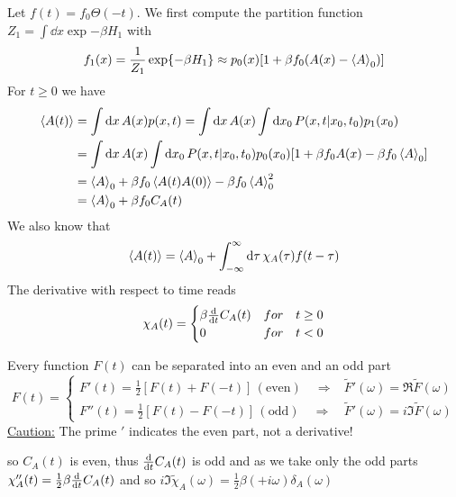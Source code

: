 \documentclass{/home/ben/Templates/notebook}
\begin{document}
	Let $f(t) = f_0 \Theta(-t)$. We first compute the partition function $Z_1 = \int \dd{x} \exp{- \beta H_1}$ with 
	\begin{equation}
	f_1(x) = \frac{1}{Z_1} \exp{- \beta H_1} \approx p_0(x) [1 + \beta f_0(A(x) - \expval{A}_0)]
	\end{equation}
	For $t \geq 0$ we have 
	\begin{align*}
		\expval{A(t)} &= \int \dd{x} A(x) p(x,t) = \int \dd{x} A(x) \int \dd{x_0} P(x, t | x_0, t_0) p_1(x_0) \\
		&= \int \dd{x} A(x) \int \dd{x_0} P(x, t | x_0, t_0) p_0(x_0) [1 + \beta f_0 A(x) - \beta f_0  \expval{A}_0] \\
		&= \expval{A}_0 + \beta f_0 \expval{A(t) A(0)} -\beta f_0 \expval{A}^2_0 \\
		&= \expval{A}_0 + \beta f_0 C_A(t)
	\end{align*}
	We also know that
	\begin{equation}
	\expval{A(t)} = \expval{A}_0 + \int_{-\infty}^{\infty} \dd{\tau} \chi_A(\tau) f(t-\tau)
	\end{equation}
	The derivative with respect to time reads
	\begin{equation*}
		\chi_A(t) = 
		\begin{cases} 
			\beta \dv{t} C_A(t) & for \quad t \geq 0 \\ 
			0 & for \quad t < 0
		\end{cases}
	\end{equation*}
	
	\begin{remark}
		Every function $F(t)$ can be separated into an even and an odd part
		\begin{equation*}
			F(t) = 
			\begin{cases} 
				F'(t) = \frac{1}{2} [F(t) + F(-t)] \, (\mathrm{even}) \quad \Rightarrow & \tilde{F}'(\omega) = \Re \tilde{F}(\omega) \\ 
				F''(t) = \frac{1}{2} [F(t) - F(-t)] \, (\mathrm{odd}) \quad \Rightarrow & \tilde{F}'(\omega) = i \Im \tilde{F}(\omega)
			\end{cases}
		\end{equation*}
		\underline{Caution:} The prime $'$ indicates the even part, not a derivative!
	\end{remark}
	
	so $C_A(t)$ is even, thus $\dv{t} C_A(t)$ is odd and as we take only the odd parts 
	$\chi_A''(t) = \frac{1}{2} \beta \dv{t} C_A(t)$
	and so $i \Im \tilde{\chi}_A(\omega) = \frac{1}{2} \beta (+ i \omega) \delta_A(\omega)$
	
\end{document}
